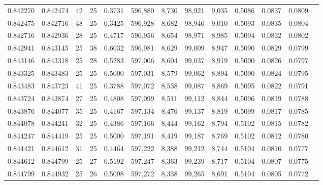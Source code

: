 \begin{tabular}{rrrrrrrrrrrrr}
0.842270 & 0.842474 &    42 &  25 &                                     0.3731 & 596,880 &   8,730 &  98,921 &   9,035 & 0.5086 & 0.0837 & 0.0809 \\
0.842475 & 0.842716 &    48 &  25 &                                     0.3425 & 596,928 &   8,682 &  98,946 &   9,010 & 0.5093 & 0.0835 & 0.0804 \\
0.842716 & 0.842936 &    28 &  25 &                                     0.4717 & 596,956 &   8,654 &  98,971 &   8,985 & 0.5094 & 0.0832 & 0.0802 \\
0.842941 & 0.843145 &    25 &  38 &                                     0.6032 & 596,981 &   8,629 &  99,009 &   8,947 & 0.5090 & 0.0829 & 0.0799 \\
0.843146 & 0.843318 &    25 &  28 &                                     0.5283 & 597,006 &   8,604 &  99,037 &   8,919 & 0.5090 & 0.0826 & 0.0797 \\
0.843325 & 0.843483 &    25 &  25 &                                     0.5000 & 597,031 &   8,579 &  99,062 &   8,894 & 0.5090 & 0.0824 & 0.0795 \\
0.843483 & 0.843723 &    41 &  25 &                                     0.3788 & 597,072 &   8,538 &  99,087 &   8,869 & 0.5095 & 0.0822 & 0.0791 \\
0.843724 & 0.843874 &    27 &  25 &                                     0.4808 & 597,099 &   8,511 &  99,112 &   8,844 & 0.5096 & 0.0819 & 0.0788 \\
0.843876 & 0.844077 &    35 &  25 &                                     0.4167 & 597,134 &   8,476 &  99,137 &   8,819 & 0.5099 & 0.0817 & 0.0785 \\
0.844078 & 0.844241 &    32 &  25 &                                     0.4386 & 597,166 &   8,444 &  99,162 &   8,794 & 0.5102 & 0.0815 & 0.0782 \\
0.844247 & 0.844419 &    25 &  25 &                                     0.5000 & 597,191 &   8,419 &  99,187 &   8,769 & 0.5102 & 0.0812 & 0.0780 \\
0.844421 & 0.844612 &    31 &  25 &                                     0.4464 & 597,222 &   8,388 &  99,212 &   8,744 & 0.5104 & 0.0810 & 0.0777 \\
0.844612 & 0.844799 &    25 &  27 &                                     0.5192 & 597,247 &   8,363 &  99,239 &   8,717 & 0.5104 & 0.0807 & 0.0775 \\
0.844799 & 0.844932 &    25 &  26 &                                     0.5098 & 597,272 &   8,338 &  99,265 &   8,691 & 0.5104 & 0.0805 & 0.0772 \\

\end{tabular}
